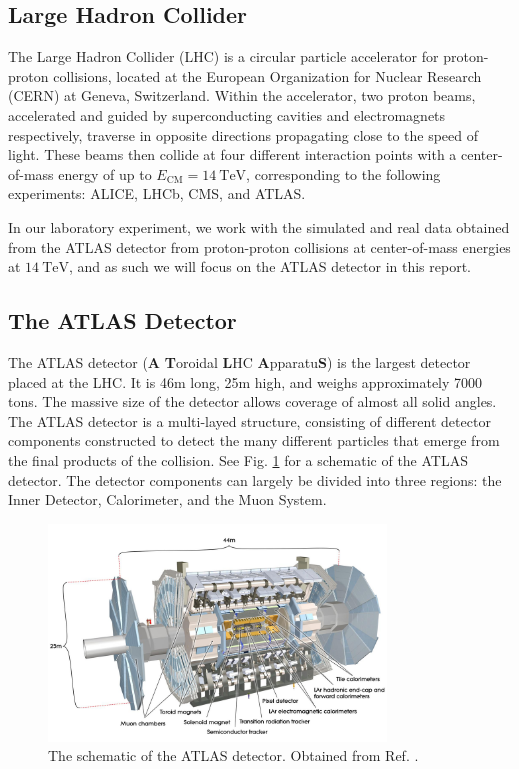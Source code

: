 \documentclass[a4paper]{report}
\numberwithin{equation}{section}
\begin{document}
\subsection{Large Hadron Collider}

The Large Hadron Collider (LHC) is a circular particle accelerator for proton-proton collisions, located at the European Organization 
for Nuclear Research (CERN) at Geneva, Switzerland. Within the accelerator, two proton beams, accelerated and guided by superconducting 
cavities and electromagnets respectively, traverse in opposite directions propagating close to the speed of light. These beams then 
collide at four different interaction points with a center-of-mass energy of up to $E_{\mathrm{CM}} = \SI{14}{\tera\electronvolt}$,
 corresponding to the following experiments: ALICE, LHCb, CMS, and ATLAS. \par

In our laboratory experiment, we work with the simulated and real data obtained from the ATLAS detector from proton-proton collisions at center-of-mass
energies at $\SI{14}{\tera\electronvolt}$, and as such we will focus on the ATLAS detector in this report.

\subsection{The ATLAS Detector}

The ATLAS detector (\textbf{A} \textbf{T}oroidal \textbf{L}HC \textbf{A}pparatu\textbf{S}) is the largest detector placed at the LHC. It is 46m long, 25m high, 
and weighs approximately 7000 tons. The massive size of the detector allows coverage of almost all solid angles. The ATLAS detector is a multi-layed structure, 
consisting of different detector components constructed to detect the many 
different particles that emerge from the final products of the collision. See Fig. \ref{fig:atlas_detector} for a schematic of the ATLAS detector. The detector components can largely 
be divided into three regions: the Inner Detector, Calorimeter, and the Muon System. 

\begin{figure}[htpb]
    \centering
    \includegraphics[width=0.8\textwidth]{ATLASDetector.jpg}
    \caption{The schematic of the ATLAS detector. Obtained from Ref. \cite{ATLASFactSheet}.}
    \label{fig:atlas_detector}
\end{figure}
\end{document}
